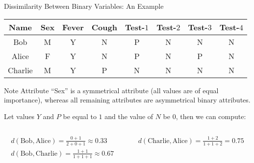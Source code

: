\begin{frame}{Dissimilarity Between Binary Variables: An Example}
  \begin{center}
    \begin{tabular}{c | c | c | c | c | c | c | c}
      \textbf{Name} & \textbf{Sex} & \textbf{Fever} & \textbf{Cough} & \textbf{Test-$1$} & \textbf{Test-$2$} & \textbf{Test-$3$} & \textbf{Test-$4$}\\\hline
      Bob & M & Y & N & P & N & N & N \\
      Alice & F & Y & N & P & N & P & N \\
      Charlie & M & Y & P & N & N & N & N \\
    \end{tabular}
  \end{center}

  \begin{alertblock}{Note}
    Attribute ``Sex'' is a symmetrical attribute (all values are of equal importance), whereas all remaining attributes are asymmetrical binary attributes.
  \end{alertblock}

  Let values $Y$ and $P$ be equal to $1$ and the value of $N$ be $0$, then we can compute:

  \vspace*{-2em}
  \begin{columns}
    \begin{column}{0.5\textwidth}
      \begin{align*}
      d(\text{Bob}, \text{Alice}) = \frac{0+1}{2+0+1} \approx 0.33\\
      d(\text{Bob}, \text{Charlie}) = \frac{1+1}{1+1+1} \approx 0.67
    \end{align*}
  \end{column}
      \begin{column}{0.5\textwidth}
      \begin{align*}
      d(\text{Charlie}, \text{Alice}) = \frac{1+2}{1+1+2} = 0.75
    \end{align*}
    \end{column}
  \end{columns}
\end{frame}

